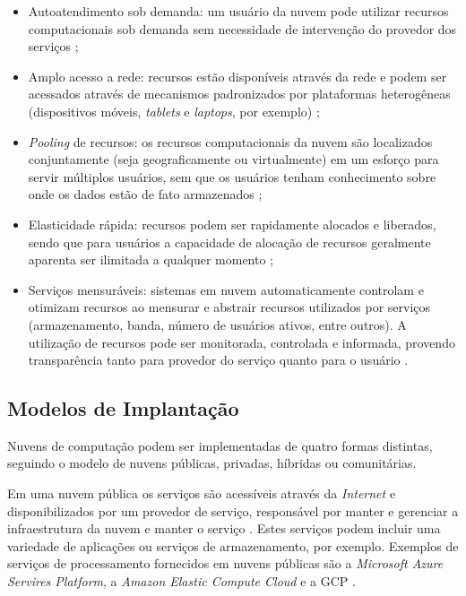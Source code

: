 \begin{itemize}
    \item Autoatendimento sob demanda: um usuário da nuvem pode utilizar recursos computacionais sob demanda sem necessidade de intervenção do provedor dos serviços \cite{public2};
    \item Amplo acesso a rede: recursos estão disponíveis através da rede e podem ser acessados através de mecanismos padronizados por plataformas heterogêneas (dispositivos móveis, \textit{tablets} e \textit{laptops}, por exemplo) \cite{nist};
    \item \textit{Pooling} de recursos: os recursos computacionais da nuvem são localizados conjuntamente (seja geograficamente ou virtualmente) em um esforço para servir múltiplos usuários, sem que os usuários tenham conhecimento sobre onde os dados estão de fato armazenados \cite{pooling};
    \item Elasticidade rápida: recursos podem ser rapidamente alocados e liberados, sendo que para usuários a capacidade de alocação de recursos geralmente aparenta ser ilimitada a qualquer momento \cite{nist};
    \item Serviços mensuráveis: sistemas em nuvem automaticamente controlam e otimizam recursos ao mensurar e abstrair recursos utilizados por serviços (armazenamento, banda, número de usuários ativos, entre outros). A utilização de recursos pode ser monitorada, controlada e informada, provendo transparência tanto para provedor do serviço quanto para o usuário \cite{nist}.
\end{itemize}

\subsection{Modelos de Implantação}

Nuvens de computação podem ser implementadas de quatro formas distintas, seguindo o modelo de nuvens públicas, privadas, híbridas ou comunitárias.

Em uma nuvem pública os serviços são acessíveis através da \textit{Internet} e disponibilizados por um provedor de serviço, responsável por manter e gerenciar a infraestrutura da nuvem e manter o serviço \cite{public2}. Estes serviços podem incluir uma variedade de aplicações ou serviços de armazenamento, por exemplo. Exemplos de serviços de processamento fornecidos em nuvens públicas são a \textit{Microsoft Azure Servires Platform}, a \textit{Amazon Elastic Compute Cloud} e a \ac{GCP} \cite{sdn}.

